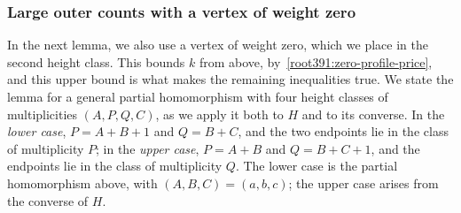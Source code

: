 \subsubsection{Large outer counts with a vertex of weight zero}
In the next lemma, we also use a vertex of weight zero, which we place in the second height class. This bounds $k$ from above, by~\eqref{root391:zero-profile-price}, and this upper bound is what makes the remaining inequalities true.
We state the lemma for a general partial homomorphism with four height classes of multiplicities $(A,P,Q,C)$, as we apply it both to $H$ and to its converse. In the \emph{lower case}, $P=A+B+1$ and $Q=B+C$, and the two endpoints lie in the class of multiplicity $P$; in the \emph{upper case}, $P=A+B$ and $Q=B+C+1$, and the endpoints lie in the class of multiplicity $Q$. The lower case is the partial homomorphism above, with $(A,B,C)=(a,b,c)$; the upper case arises from the converse of $H$.

